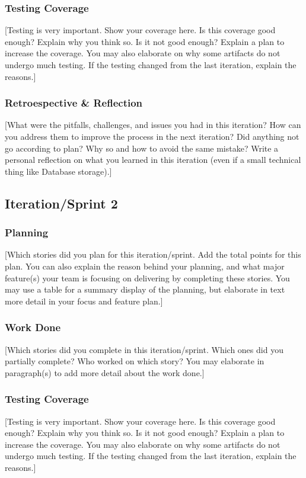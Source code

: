 \documentclass{article}
\begin{document}
\subsubsection{Testing Coverage}
[Testing is very important. Show your coverage here. Is this coverage good enough? Explain why you think so. Is it not good enough? Explain a plan to increase the coverage. You may also elaborate on why some artifacts do not undergo much testing. If the testing changed from the last iteration, explain the reasons.]

\subsubsection{Retroespective \& Reflection}
[What were the pitfalls, challenges, and issues you had in this iteration? How can you address them to improve the process in the next iteration? Did anything not go according to plan? Why so and how to avoid the same mistake? Write a personal reflection on what you learned in this iteration (even if a small technical thing like Database storage).]


\subsection{Iteration/Sprint 2}
\subsubsection{Planning}
[Which stories did you plan for this iteration/sprint. Add the total points for this plan. You can also explain the reason behind your planning, and what major feature(s) your team is focusing on delivering by completing these stories. You may use a table for a summary display of the planning, but elaborate in text more detail in your focus and feature plan.]

\subsubsection{Work Done}
[Which stories did you complete in this iteration/sprint. Which ones did you partially complete? Who worked on which story? You may elaborate in paragraph(s) to add more detail about the work done.]

\subsubsection{Testing Coverage}
[Testing is very important. Show your coverage here. Is this coverage good enough? Explain why you think so. Is it not good enough? Explain a plan to increase the coverage. You may also elaborate on why some artifacts do not undergo much testing. If the testing changed from the last iteration, explain the reasons.]
\end{document}
